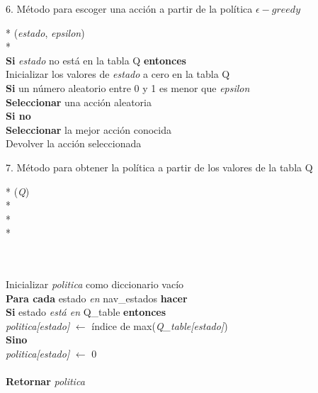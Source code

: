 \documentclass[conference,a4paper]{IEEEtran}
\begin{document}
6. Método para escoger una acción a partir de la política \(\epsilon-greedy\)\ 
  \begin{pseudo}*
    (\textit{estado}, \textit{epsilon}) \\*
    \multicolumn{2}{l}{\textbf{Algoritmo}:}\\
    \textbf{Si} \textit{estado} no está en la tabla Q \textbf{entonces} \\
    \> Inicializar los valores de \textit{estado} a cero en la tabla Q \\
    \textbf{Si} un número aleatorio entre 0 y 1 es menor que \textit{epsilon}\\
    \> \textbf{Seleccionar} una acción aleatoria \\
    \textbf{Si no} \\
    \> \textbf{Seleccionar} la mejor acción conocida \\
    Devolver la acción seleccionada
  \end{pseudo}

7. Método para obtener la política a partir de los valores de la tabla Q
  \begin{pseudo}*
    (\textit{Q}) \\*
     \\*
     \\*

     \\
    \\
    Inicializar \textit{politica} como diccionario vacío \\
    \textbf{Para cada} estado \textit{en} nav\_estados \textbf{hacer} \\
    \> \textbf{Si} estado \textit{está en} Q\_table \textbf{entonces} \\
    \> \> \textit{politica[estado]} $\leftarrow$ índice de max(\textit{Q\_table[estado]}) \\
    \> \textbf{Sino} \\
    \> \> \textit{politica[estado]} $\leftarrow$ 0 \\
    \\
    \textbf{Retornar} \textit{politica}
    
  \end{pseudo}
  
\end{document}
